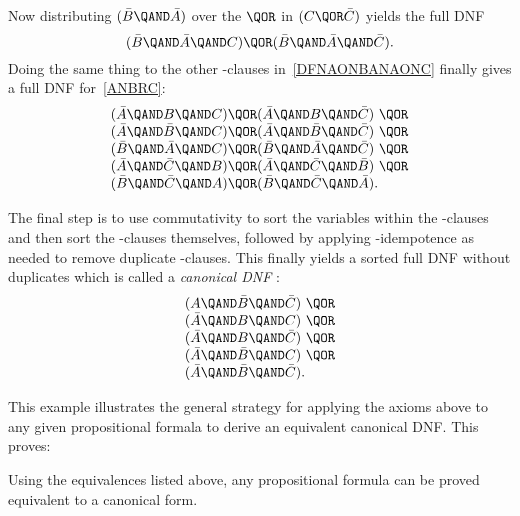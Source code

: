 \iffalse
$\bar{B} \QAND \bar{A}$
is equivalent to
\[
(\bar{B} \QAND \bar{A}) \QAND (C \QOR \bar{C}).
\]
\fi

Now distributing $(\bar{B} \QAND \bar{A})$ over the $\QOR$ in $(C \QOR
\bar{C})$ yields the full DNF
\[
(\bar{B} \QAND \bar{A} \QAND C) \QOR
(\bar{B} \QAND \bar{A} \QAND \bar{C}).
\]
Doing the same thing to the other \QAND-clauses in~\eqref{DFNAONBANAONC}
finally gives a full DNF for~\eqref{ANBRC}:
\[\begin{array}{l}
(\bar{A} \QAND B \QAND C) \QOR (\bar{A} \QAND B \QAND \bar{C})\ \QOR\\
(\bar{A} \QAND \bar{B} \QAND C) \QOR  (\bar{A} \QAND \bar{B} \QAND \bar{C})\ \QOR\\
(\bar{B} \QAND \bar{A} \QAND C) \QOR  (\bar{B} \QAND \bar{A} \QAND \bar{C})\ \QOR\\
(\bar{A} \QAND \bar{C} \QAND B) \QOR  (\bar{A} \QAND \bar{C} \QAND \bar{B})\ \QOR\\
(\bar{B} \QAND \bar{C} \QAND A) \QOR  (\bar{B} \QAND \bar{C} \QAND \bar{A}).
\end{array}\]

The final step is to use commutativity to sort the variables within
the \QAND-clauses and then sort the \QAND-clauses themselves, followed
by applying \QOR-idempotence as needed to remove duplicate
\QAND-clauses.  This finally yields a sorted full DNF
without duplicates which is called a \emph{canonical DNF}
:
\[\begin{array}{l}
(A \QAND \bar{B} \QAND \bar{C})\ \QOR\\
(\bar{A} \QAND B \QAND C)\ \QOR\\
(\bar{A} \QAND B \QAND \bar{C})\ \QOR\\
(\bar{A} \QAND \bar{B} \QAND C)\ \QOR\\
(\bar{A} \QAND \bar{B} \QAND \bar{C}).
\end{array}\]

This example illustrates the general strategy for applying the axioms
above to any given propositional formala to derive an equivalent
canonical DNF.  This proves:
\begin{theorem}\label{completeDNF}
Using the equivalences listed above, any propositional formula can be
proved equivalent to a canonical form.
\end{theorem}

